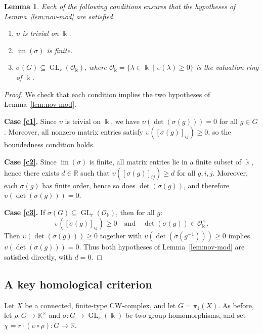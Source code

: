 \documentclass[11pt]{amsart}
\newtheorem{lemma}[theorem]{Lemma}
\theoremstyle{definition}
\newcommand{\R}{\mathbb{R}}
\newcommand{\K}{\mathbb{K}}
\renewcommand{\k}{\Bbbk}
\newcommand{\cO}{\mathcal{O}}
\DeclareMathOperator{\im}{im}
\DeclareMathOperator{\GL}{GL}
\begin{document}
\begin{lemma}
\label{lem:novikov-conditions}
Each of the following conditions ensures that the hypotheses of
Lemma~\ref{lem:nov-mod} are satisfied.
\begin{enumerate}[label=\textup{(\alph*)}]
\item \label{c1}
$\upsilon$ is trivial on $\k$.
\item \label{c2}
$\im(\sigma)$ is finite.
\item \label{c3}
$\sigma(G)\subseteq \GL_r(\cO_\k)$, where 
$\cO_\k=\{\lambda\in \k \mid \upsilon(\lambda)\geq 0\}$ is the valuation ring of $\k$.
\end{enumerate}
\end{lemma}

\begin{proof}
We check that each condition implies the two hypotheses of
Lemma~\ref{lem:nov-mod}.

\medskip
\noindent\textbf{Case \ref{c1}.}
Since $\upsilon$ is trivial on $\k$, we have
$\upsilon(\det(\sigma(g)))=0$ for all $g\in G$. 
Moreover, all nonzero matrix entries satisfy $\upsilon([\sigma(g)]_{ij})\ge 0$,
so the boundedness condition holds.

\medskip
\noindent\textbf{Case \ref{c2}.}
Since $\im(\sigma)$ is finite, all matrix entries lie in a finite subset of $\k$,
hence there exists $d\in\R$ such that $\upsilon([\sigma(g)]_{ij})\ge d$ 
for all $g,i,j$. 
Moreover, each $\sigma(g)$ has finite order, hence so does
$\det(\sigma(g))$, and therefore $\upsilon(\det(\sigma(g)))=0$.
 
\medskip
\noindent\textbf{Case \ref{c3}.}
If $\sigma(G)\subseteq \GL_r(\cO_\k)$, then for all $g$:
\[
\upsilon([\sigma(g)]_{ij}) \ge 0
\quad\text{and}\quad
\det(\sigma(g))\in \cO_\k^\times.
\]
Then  $\upsilon(\det(\sigma(g)))\geq 0$ together with 
$\upsilon(\det(\sigma(g^{-1})))\geq 0$ implies  $\upsilon(\det(\sigma(g)))= 0$.
Thus both hypotheses of Lemma~\ref{lem:nov-mod} are satisfied directly,
with $d=0$.
\end{proof}

\subsection{A key homological criterion}
\label{subsec:sigma-cjls}

Let $X$ be a connected, finite-type CW-complex, and let $G=\pi_1(X)$. 
As before, let $\rho\colon G\to \K^{\times}$ and 
$\sigma\colon G\to \GL_r(\k)$ be two group homomorphisms, 
and set $\chi= r\cdot(\upsilon\circ \rho)\colon G\to \R$.
\end{document}
